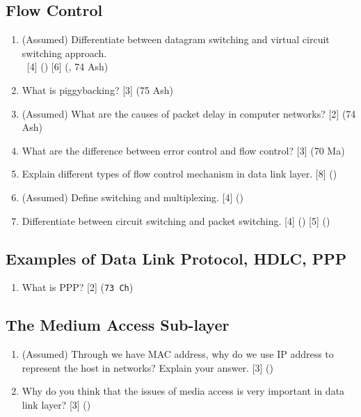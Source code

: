 \documentclass[12pt]{article}
\newcommand{\enter}{\\\textcolor{white}{1}}
\begin{document}
	\subsection{Flow Control}
		\begin{enumerate}[noitemsep, topsep=0pt]
			\item (Assumed) Differentiate between datagram switching and virtual circuit switching approach.
			\enter\hfill [4] () [6] (, 74 Ash)

			\item What is piggybacking? \hfill [3] (75 Ash)

			\item (Assumed) What are the causes of packet delay in computer networks? \hfill [2] (74 Ash)

			\item What are the difference between error control and flow control? \hfill [3] (70 Ma)

			\item Explain different types of flow control mechanism in data link layer. \hfill [8] ()

			\item (Assumed) Define switching and multiplexing. \hfill [4] ()

			\item Differentiate between circuit switching and packet switching. \hfill [4] () [5] ()
		\end{enumerate}

	\subsection{Examples of Data Link Protocol, HDLC, PPP}
		\begin{enumerate}
			\item What is PPP? \hfill[2] (\texttt{73 Ch})
		\end{enumerate}
	\subsection{The Medium Access Sub-layer}
		\begin{enumerate}[noitemsep, topsep=0pt]
			\item (Assumed) Through we have MAC address, why do we use IP address to represent the host in networks? Explain your answer. \hfill [3] ()

			\item Why do you think that the issues of media access is very important in data link layer? \hfill [3] ()
		\end{enumerate}
\end{document}
